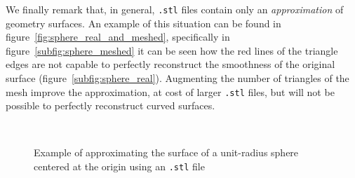 \smallskip
We finally remark that, in general, \verb|.stl| files contain only an \emph{approximation} of geometry surfaces. An example of this situation can be found in figure~\vref{fig:sphere_real_and_meshed}, specifically in figure~\ref{subfig:sphere_meshed} it can be seen how the red lines of the triangle edges are not capable to perfectly reconstruct the smoothness of the original surface (figure~\ref{subfig:sphere_real}). Augmenting the number of triangles of the mesh improve the approximation, at cost of larger \verb|.stl| files, but will not be possible to perfectly reconstruct curved surfaces.

\begin{figure}
	\centering
	 \\
	\caption{Example of approximating the surface of a unit-radius sphere centered at the origin using an \texttt{.stl} file}
	\label{fig:sphere_real_and_meshed}
\end{figure}

